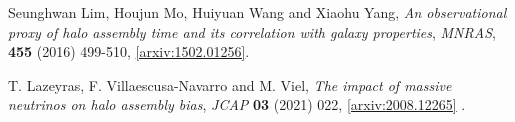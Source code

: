 \documentclass[a4paper,11pt]{article}
\begin{document}
\begin{thebibliography}{99}
 Seunghwan Lim, Houjun Mo, Huiyuan Wang and Xiaohu Yang, \emph{An observational proxy of halo assembly time and its correlation with galaxy properties}, \emph{MNRAS}, {\bf 455} (2016) 499-510, \href{https://arxiv.org/abs/1502.01256}{[arxiv:1502.01256]}.


T. Lazeyras, F. Villaescusa-Navarro and M. Viel, \emph{The impact of massive neutrinos on halo assembly bias}, \emph{JCAP} {\bf 03} (2021) 022,  \href{https://arxiv.org/abs/2008.12265}{[arxiv:2008.12265]} .








\end{thebibliography}
\end{document}
